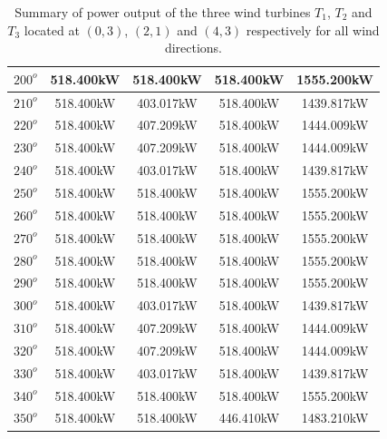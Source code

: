 \begin{table}[H]
\begin{tabular}{|c|c|c|c|c|}
	     \hline
	     $200^{o}$ & 518.400kW & 518.400kW & 518.400kW & 1555.200kW \\
	     \hline
	     $210^{o}$ & 518.400kW & 403.017kW & 518.400kW & 1439.817kW \\
	     \hline
	     $220^{o}$ & 518.400kW & 407.209kW & 518.400kW & 1444.009kW \\
	     \hline
	     $230^{o}$ & 518.400kW & 407.209kW & 518.400kW & 1444.009kW \\
	     \hline
	     $240^{o}$ & 518.400kW & 403.017kW & 518.400kW & 1439.817kW \\
	     \hline
	     $250^{o}$ & 518.400kW & 518.400kW & 518.400kW & 1555.200kW \\
	     \hline
	     $260^{o}$ & 518.400kW & 518.400kW & 518.400kW & 1555.200kW \\
	     \hline
	     $270^{o}$ & 518.400kW & 518.400kW & 518.400kW & 1555.200kW \\
	     \hline
	     $280^{o}$ & 518.400kW & 518.400kW & 518.400kW & 1555.200kW \\
	     \hline
	     $290^{o}$ & 518.400kW & 518.400kW & 518.400kW & 1555.200kW \\
	     \hline
	     $300^{o}$ & 518.400kW & 403.017kW & 518.400kW & 1439.817kW \\
	     \hline
	     $310^{o}$ & 518.400kW & 407.209kW & 518.400kW & 1444.009kW \\
	     \hline
	     $320^{o}$ & 518.400kW & 407.209kW & 518.400kW & 1444.009kW \\
	     \hline
	     $330^{o}$ & 518.400kW & 403.017kW & 518.400kW & 1439.817kW \\
	     \hline
	     $340^{o}$ & 518.400kW & 518.400kW & 518.400kW & 1555.200kW \\
	     \hline
	     $350^{o}$ & 518.400kW & 518.400kW & 446.410kW & 1483.210kW \\
	     \hline
	    \end{tabular}
	    \caption{Summary of power output of the three wind turbines $T_1$, $T_2$ and $T_3$ located at $(0,3)$, $(2,1)$ and $(4,3)$ respectively for all wind directions.}
	    \label{summaryRandom2-3b}
	\end{table}
	\doublespacing
	
